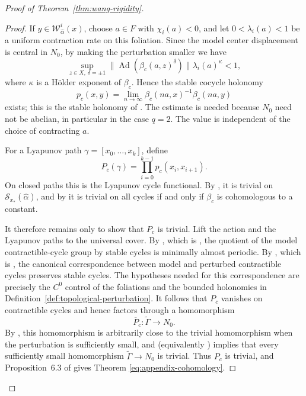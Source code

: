 \documentclass[11pt]{amsart}
\numberwithin{equation}{section}
\theoremstyle{plain}
\begin{document}
\begin{proof}[Proof of Theorem~\ref{thm:wang-rigidity}]
\begin{proof}
If $y\in\mathcal W^i_{\widehat\alpha}(x)$, choose $a\in F$ with
$\chi_i(a)<0$, and let $0<\lambda_i(a)<1$ be a uniform contraction
rate on this foliation.  Since the model center displacement is central
in $N_0$, by making the perturbation smaller we have
\[
\sup_{z\in X,\ \delta=\pm1}
\|\operatorname{Ad}(\beta_c(a,z)^\delta)\|
\lambda_i(a)^\kappa<1,
\]
where $\kappa$ is a H\"older exponent of $\beta_c$.  Hence the stable
cocycle holonomy
\begin{equation}\label{eq:appendix-cocycle-holonomy}
p_c(x,y)
=
\lim_{n\to\infty}
\beta_c(na,x)^{-1}\beta_c(na,y)
\end{equation}
exists; this is the stable holonomy of
\cite[Definition~6.1]{Wang26}.  The estimate is needed because $N_0$
need not be abelian, in particular in the case $q=2$.  The value is
independent of the choice of contracting $a$.

For a Lyapunov path
$\gamma=[x_0,\ldots,x_k]$, define
\[
P_c(\gamma)
=
\prod_{i=0}^{k-1}p_c(x_i,x_{i+1}).
\]
On closed paths this is the Lyapunov cycle functional.  By
\cite[Lemma~6.4]{Wang26}, it is trivial on
$\mathcal S_{x_*}(\widehat\alpha)$, and by
\cite[Proposition~6.3]{Wang26} it is trivial on all cycles if and only if
$\beta_c$ is cohomologous to a constant.

It therefore remains only to show that $P_c$ is trivial.  Lift the action
and the Lyapunov paths to the universal cover.  By
\cite[Proposition~6.5]{Wang26}, which is
\cite[Theorem~7.2]{VinWang}, the quotient of the model contractible-cycle
group by stable cycles is minimally almost periodic.  By
\cite[Proposition~6.6]{Wang26}, which is
\cite[Theorem~12.2]{VinWang}, the canonical correspondence between model
and perturbed contractible cycles preserves stable cycles.  The hypotheses
needed for this correspondence are precisely the $C^0$ control of the
foliations and the bounded holonomies in
Definition~\ref{def:topological-perturbation}.  It follows that $P_c$
vanishes on contractible cycles and hence factors through a homomorphism
\begin{equation}\label{eq:appendix-lattice-hom}
\overline P_c:\widetilde\Gamma\longrightarrow N_0.
\end{equation}
By \cite[Lemma~6.10]{Wang26}, this homomorphism is arbitrarily close to
the trivial homomorphism when the perturbation is sufficiently small, and
\cite[Lemma~6.9]{Wang26} (equivalently
\cite[Lemma~11.1]{VinWang}) implies that every sufficiently small
homomorphism $\widetilde\Gamma\to N_0$ is trivial.  Thus $P_c$ is trivial,
and Proposition~6.3 of \cite{Wang26} gives Theorem
\eqref{eq:appendix-cohomology}.
\end{proof}



\end{proof}
\end{document}
